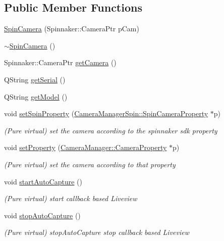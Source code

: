 \subsection*{Public Member Functions}
\begin{DoxyCompactItemize}
\item 
\mbox{\hyperlink{class_spin_camera_a448a5ad609674d1187641b0e3cc706d3}{Spin\+Camera}} (Spinnaker\+::\+Camera\+Ptr p\+Cam)
\item 
\mbox{\hyperlink{class_spin_camera_ab6480a04f9be775bbf9a7b61a248921b}{$\sim$\+Spin\+Camera}} ()
\item 
Spinnaker\+::\+Camera\+Ptr \mbox{\hyperlink{class_spin_camera_aa7d20cfe4e16b461580e98c0cd8982f7}{get\+Camera}} ()
\item 
Q\+String \mbox{\hyperlink{class_spin_camera_a2427902f7a8bc6cca397966b14399e9b}{get\+Serial}} ()
\item 
Q\+String \mbox{\hyperlink{class_spin_camera_a254522436d6e70878a8b2df0654614c8}{get\+Model}} ()
\item 
void \mbox{\hyperlink{class_spin_camera_abb8eddf9373bf488a8eaa87b117d40c0}{set\+Spin\+Property}} (\mbox{\hyperlink{class_camera_manager_spin_1_1_spin_camera_property}{Camera\+Manager\+Spin\+::\+Spin\+Camera\+Property}} $\ast$p)
\begin{DoxyCompactList}\small\item\em (Pure virtual) set the camera according to the spinnaker sdk property \end{DoxyCompactList}\item 
void \mbox{\hyperlink{class_spin_camera_a3083f5156bef457595fb0ca5ed3a6cf1}{set\+Property}} (\mbox{\hyperlink{class_camera_manager_1_1_camera_property}{Camera\+Manager\+::\+Camera\+Property}} $\ast$p)
\begin{DoxyCompactList}\small\item\em (Pure virtual) set the camera according to that property \end{DoxyCompactList}\item 
void \mbox{\hyperlink{class_spin_camera_acee6b2c38898f23b5bbba4a7810caa49}{start\+Auto\+Capture}} ()
\begin{DoxyCompactList}\small\item\em (Pure virtual) start callback based Liveview \end{DoxyCompactList}\item 
void \mbox{\hyperlink{class_spin_camera_a161f8d383c56161a8e7731d7299504db}{stop\+Auto\+Capture}} ()
\begin{DoxyCompactList}\small\item\em (Pure virtual) stop\+Auto\+Capture stop callback based Liveview \end{DoxyCompactList}\item 

\end{DoxyCompactItemize}
